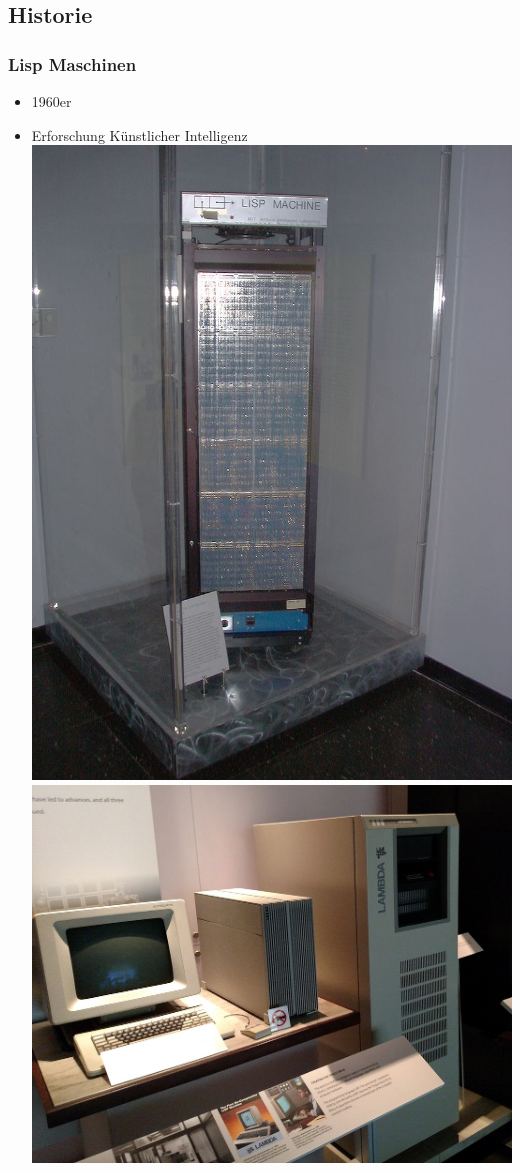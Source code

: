 \documentclass{beamer}
\begin{document}
\begin{frame}
	\section{Historie}
\frametitle{Lisp Maschinen}
	\begin{itemize}
            \item 1960er
            \item Erforschung Künstlicher Intelligenz
            \includegraphics[scale=0.3]{bilder/lispm.jpg}
            \includegraphics[scale=0.1]{bilder/lispm1.jpg}

\end{itemize}
\end{frame}
\end{document}
